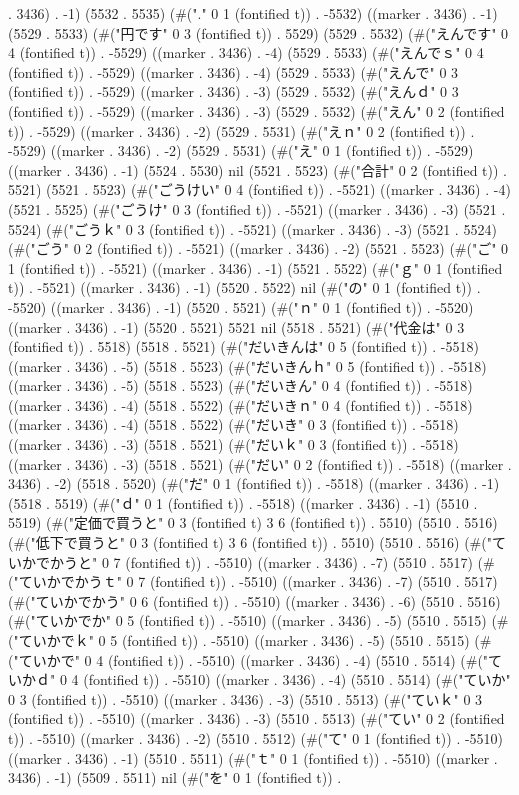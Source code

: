 . 3436) . -1) (5532 . 5535) (#("." 0 1 (fontified t)) . -5532) ((marker . 3436) . -1) (5529 . 5533) (#("円です" 0 3 (fontified t)) . 5529) (5529 . 5532) (#("えんです" 0 4 (fontified t)) . -5529) ((marker . 3436) . -4) (5529 . 5533) (#("えんでｓ" 0 4 (fontified t)) . -5529) ((marker . 3436) . -4) (5529 . 5533) (#("えんで" 0 3 (fontified t)) . -5529) ((marker . 3436) . -3) (5529 . 5532) (#("えんｄ" 0 3 (fontified t)) . -5529) ((marker . 3436) . -3) (5529 . 5532) (#("えん" 0 2 (fontified t)) . -5529) ((marker . 3436) . -2) (5529 . 5531) (#("えｎ" 0 2 (fontified t)) . -5529) ((marker . 3436) . -2) (5529 . 5531) (#("え" 0 1 (fontified t)) . -5529) ((marker . 3436) . -1) (5524 . 5530) nil (5521 . 5523) (#("合計" 0 2 (fontified t)) . 5521) (5521 . 5523) (#("ごうけい" 0 4 (fontified t)) . -5521) ((marker . 3436) . -4) (5521 . 5525) (#("ごうけ" 0 3 (fontified t)) . -5521) ((marker . 3436) . -3) (5521 . 5524) (#("ごうｋ" 0 3 (fontified t)) . -5521) ((marker . 3436) . -3) (5521 . 5524) (#("ごう" 0 2 (fontified t)) . -5521) ((marker . 3436) . -2) (5521 . 5523) (#("ご" 0 1 (fontified t)) . -5521) ((marker . 3436) . -1) (5521 . 5522) (#("ｇ" 0 1 (fontified t)) . -5521) ((marker . 3436) . -1) (5520 . 5522) nil (#("の" 0 1 (fontified t)) . -5520) ((marker . 3436) . -1) (5520 . 5521) (#("ｎ" 0 1 (fontified t)) . -5520) ((marker . 3436) . -1) (5520 . 5521) 5521 nil (5518 . 5521) (#("代金は" 0 3 (fontified t)) . 5518) (5518 . 5521) (#("だいきんは" 0 5 (fontified t)) . -5518) ((marker . 3436) . -5) (5518 . 5523) (#("だいきんｈ" 0 5 (fontified t)) . -5518) ((marker . 3436) . -5) (5518 . 5523) (#("だいきん" 0 4 (fontified t)) . -5518) ((marker . 3436) . -4) (5518 . 5522) (#("だいきｎ" 0 4 (fontified t)) . -5518) ((marker . 3436) . -4) (5518 . 5522) (#("だいき" 0 3 (fontified t)) . -5518) ((marker . 3436) . -3) (5518 . 5521) (#("だいｋ" 0 3 (fontified t)) . -5518) ((marker . 3436) . -3) (5518 . 5521) (#("だい" 0 2 (fontified t)) . -5518) ((marker . 3436) . -2) (5518 . 5520) (#("だ" 0 1 (fontified t)) . -5518) ((marker . 3436) . -1) (5518 . 5519) (#("ｄ" 0 1 (fontified t)) . -5518) ((marker . 3436) . -1) (5510 . 5519) (#("定価で買うと" 0 3 (fontified t) 3 6 (fontified t)) . 5510) (5510 . 5516) (#("低下で買うと" 0 3 (fontified t) 3 6 (fontified t)) . 5510) (5510 . 5516) (#("ていかでかうと" 0 7 (fontified t)) . -5510) ((marker . 3436) . -7) (5510 . 5517) (#("ていかでかうｔ" 0 7 (fontified t)) . -5510) ((marker . 3436) . -7) (5510 . 5517) (#("ていかでかう" 0 6 (fontified t)) . -5510) ((marker . 3436) . -6) (5510 . 5516) (#("ていかでか" 0 5 (fontified t)) . -5510) ((marker . 3436) . -5) (5510 . 5515) (#("ていかでｋ" 0 5 (fontified t)) . -5510) ((marker . 3436) . -5) (5510 . 5515) (#("ていかで" 0 4 (fontified t)) . -5510) ((marker . 3436) . -4) (5510 . 5514) (#("ていかｄ" 0 4 (fontified t)) . -5510) ((marker . 3436) . -4) (5510 . 5514) (#("ていか" 0 3 (fontified t)) . -5510) ((marker . 3436) . -3) (5510 . 5513) (#("ていｋ" 0 3 (fontified t)) . -5510) ((marker . 3436) . -3) (5510 . 5513) (#("てい" 0 2 (fontified t)) . -5510) ((marker . 3436) . -2) (5510 . 5512) (#("て" 0 1 (fontified t)) . -5510) ((marker . 3436) . -1) (5510 . 5511) (#("ｔ" 0 1 (fontified t)) . -5510) ((marker . 3436) . -1) (5509 . 5511) nil (#("を" 0 1 (fontified t)) . 